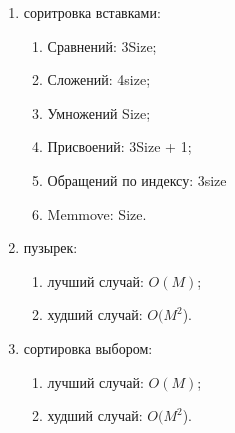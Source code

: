 	\begin{enumerate}[1)]
		\item соритровка вставками:
		\begin{enumerate}
			\item Сравнений: 3Size;
			\item Сложений: 4size;
			\item Умножений Size;
			\item Присвоений: 3Size + 1;
			\item Обращений по индексу: 3size
			\item Memmove: Size.
		\end{enumerate}
		\item пузырек:
		\begin{enumerate}
			\item лучший случай: $O(M)$;
			\item худший случай: $O(M^2$).
		\end{enumerate}
		
		\item сортировка выбором:
		
		\begin{enumerate}
			\item лучший случай: $O(M)$;
			\item худший случай: $O(M^2$).
		\end{enumerate}
	\end{enumerate}
	
	